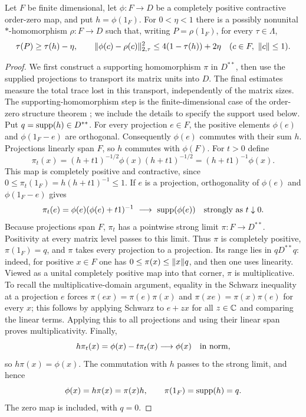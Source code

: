 \begin{lemma}
\label{u:lem:homomorphism-replacement}
Let $F$ be finite dimensional, let $\phi:F\to D$ be a completely positive
contractive order-zero map, and put $h=\phi(1_F)$.  For $0<\eta<1$ there
is a possibly nonunital $*$-homomorphism $\rho:F\to D$ such that, writing
$P=\rho(1_F)$, for every $\tau\in\Lambda$,
\begin{equation}
 \tau(P)\ge\tau(h)-\eta,
 \qquad
 \lVert\phi(c)-\rho(c)\rVert_{2,\tau}^{2}
 \le 4(1-\tau(h))+2\eta
 \quad (c\in F,\ \lVert c\rVert\le1).
 \label{u:eq:homomorphism-replacement}
\end{equation}
\end{lemma}

\begin{proof}
We first construct a supporting homomorphism $\pi$ in $D^{**}$, then
use the supplied projections to transport its matrix units into $D$.
The final estimates measure the total trace lost in this transport,
independently of the matrix sizes.  The supporting-homomorphism step
is the finite-dimensional case of the order-zero structure theorem
\cite[Theorem~3.3]{WZ}; we include the details to specify the support
used below.  Put $q=\operatorname{supp}(h)\in D^{**}$.  For every projection $e\in F$,
the positive elements $\phi(e)$ and $\phi(1_F-e)$ are orthogonal.
Consequently $\phi(e)$ commutes with their sum $h$.  Projections linearly
span $F$, so $h$ commutes with $\phi(F)$.  For $t>0$ define
\[
 \pi_t(x)=(h+t1)^{-1/2}\phi(x)(h+t1)^{-1/2}
         =(h+t1)^{-1}\phi(x).
\]
This map is completely positive and contractive, since
$0\le\pi_t(1_F)=h(h+t1)^{-1}\le1$.  If $e$ is a projection, orthogonality
of $\phi(e)$ and $\phi(1_F-e)$ gives
\[
 \pi_t(e)=\phi(e)(\phi(e)+t1)^{-1}
 \ \longrightarrow\ \operatorname{supp}(\phi(e))
 \quad\hbox{strongly as }t\downarrow0.
\]
Because projections span $F$, $\pi_t$ has a pointwise strong limit
$\pi:F\to D^{**}$.  Positivity at every matrix level passes to this
limit.  Thus $\pi$ is completely positive, $\pi(1_F)=q$, and $\pi$ takes
every projection to a projection.  Its range lies in $qD^{**}q$:
indeed, for positive $x\in F$ one has
$0\le\pi(x)\le\lVert x\rVert q$, and then one uses linearity.
Viewed as a unital completely positive map into that corner, $\pi$ is
multiplicative.  To recall the multiplicative-domain argument, equality
in the Schwarz inequality at a projection $e$ forces
$\pi(ex)=\pi(e)\pi(x)$ and $\pi(xe)=\pi(x)\pi(e)$ for every $x$;
this follows by applying Schwarz to $e+zx$ for all $z\in\mathbb C$ and comparing
the linear terms.  Applying this to all projections and using their
linear span proves multiplicativity.  Finally,
\[
 h\pi_t(x)=\phi(x)-t\pi_t(x)\longrightarrow\phi(x)
 \quad\hbox{in norm},
\]
so $h\pi(x)=\phi(x)$.  The commutation with $h$ passes to the strong
limit, and hence
\begin{equation}
 \phi(x)=h\pi(x)=\pi(x)h,
 \qquad \pi(1_F)=\operatorname{supp}(h)=q.
 \label{u:eq:order-zero-support}
\end{equation}
The zero map is included, with $q=0$.


\end{proof}

